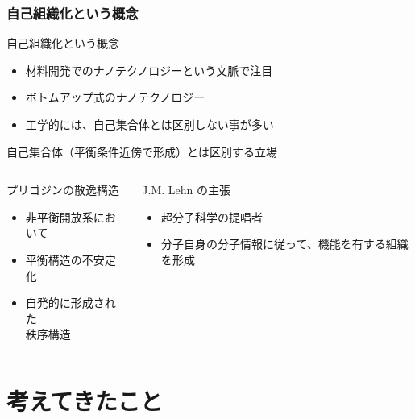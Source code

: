 \documentclass[12pt, dvipdfmx]{beamer}
\begin{document}
\begin{frame}
    \frametitle{自己組織化という概念}
    \begin{block}{自己組織化という概念}
        \begin{itemize}
            \item 材料開発でのナノテクノロジーという文脈で注目
            \item ボトムアップ式のナノテクノロジー
            \item 工学的には、自己集合体とは区別しない事が多い
        \end{itemize}
    \end{block}

    \begin{exampleblock}{自己集合体（平衡条件近傍で形成）とは区別する立場}
        \begin{columns}[T, onlytextwidth]
            \begin{alertblock}{プリゴジンの散逸構造}
                \begin{itemize}
                    \item 非平衡開放系において
                    \item 平衡構造の不安定化
                    \item 自発的に形成された\\秩序構造
                \end{itemize}
            \end{alertblock}
            \begin{alertblock}{J.M. Lehn の主張}
                \begin{itemize}
                    \item 超分子科学の提唱者
                    \item 分子自身の分子情報に従って、機能を有する組織を形成
                \end{itemize}
            \end{alertblock}
        \end{columns}
    \end{exampleblock}
\end{frame}

\section{考えてきたこと}
\end{document}

